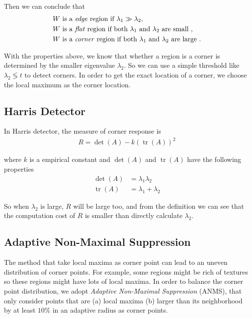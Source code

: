 \documentclass[runningheads]{llncs}
\begin{document}
\par
Then we can conclude that
\begin{align*}
    W &\textrm{ is a \emph{edge} region if } \lambda_1 \gg \lambda_2, \\
    W &\textrm{ is a \emph{flat} region if both } \lambda_1 \textrm{ and } \lambda_2 \textrm{ are small }, \\
    W &\textrm{ is a \emph{corner} region if both } \lambda_1 \textrm{ and } \lambda_2 \textrm{ are large }. \\
\end{align*}
\par
With the properties above, we know that whether a region is a corner
is determined by the smaller eigenvalue $\lambda_2$.
So we can use a simple threshold like $\lambda_2 \lessgtr t$ to detect corners.
In order to get the exact location of a corner,
we choose the local maximum as the corner location.

\subsection{Harris Detector}
In Harris detector, the measure of corner response is
\begin{align}
    R = \operatorname{det} (A) - k (\operatorname{tr} (A))^2
\end{align}
\par
where $k$ is a empirical constant and
$\operatorname{det} (A)$ and $\operatorname{tr} (A)$
have the following properties
\begin{align*}
    \operatorname{det} (A) &= \lambda_1 \lambda_2 \\
    \operatorname{tr} (A) &= \lambda_1 + \lambda_2
\end{align*}
\par
So when $\lambda_2$ is large, $R$ will be large too,
and from the definition we can see that the computation
cost of $R$ is smaller than directly calculate $\lambda_2$. 

\subsection{Adaptive Non-Maximal Suppression}
The method that take local maxima
as corner point
can lead to an uneven distribution of corner points.
For example, some regions might be rich of textures
so these regions might have lots of local maxima.
In order to balance the corner point distribution,
we adopt \emph{Adaptive Non-Maximal Suppression} (ANMS),
that only consider points that are (a) local maxima
(b) larger than its neighborhood by at least $10\%$ in
an adaptive radius as corner points.
\end{document}
